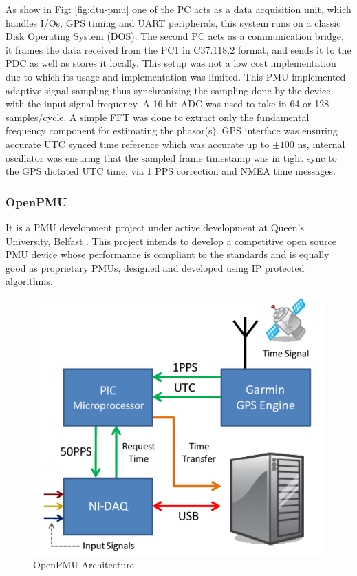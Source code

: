  As show in Fig: \ref{fig:dtu-pmu} one of the PC acts as a data acquisition unit, which handles I/Os, GPS timing and UART peripherals, this system runs on a classic Disk Operating System (DOS). The second PC acts as a communication bridge, it frames the data received from the PC1 in C37.118.2 format, and sends it to the PDC as well as stores it locally. This setup was not a low cost implementation due to which its usage and implementation was limited. This PMU implemented adaptive signal sampling thus synchronizing the sampling done by the device with the input signal frequency. A 16-bit ADC was used to take in 64 or 128 samples/cycle.  A simple FFT was done to extract only the fundamental frequency component for estimating the phasor(s). GPS interface was ensuring accurate UTC synced time reference which was accurate up to   $ \pm 100$ ns, internal oscillator was ensuring that the sampled frame timestamp was in tight sync to the GPS dictated UTC time, via 1 PPS correction and NMEA time messages. 
 
 \subsubsection{OpenPMU}
 It is a PMU development project under active development at Queen's University, Belfast \cite{paper:openpmu} . This project intends to develop a competitive open source PMU device whose performance is compliant to the standards and is equally good as proprietary PMUs, designed and developed using IP protected algorithms. 
 
 \begin{figure}[h]
 	\centering
 	\includegraphics[scale=0.5]{fig/OpenPMU.png}
 	\caption{OpenPMU Architecture}
 	\label{fig:OpenPMU}
 \end{figure}    
 
